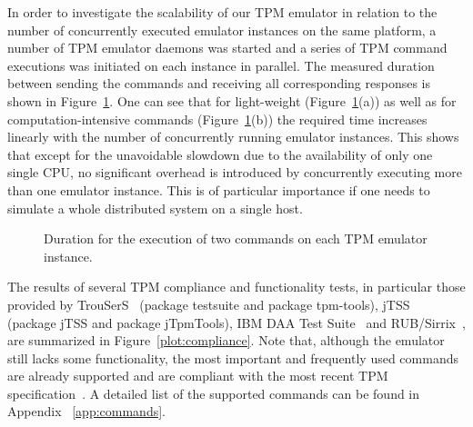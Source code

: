 \documentclass[runningheads]{llncs}
\begin{document}
In order to investigate the scalability of our TPM emulator in relation to
the number of concurrently executed emulator instances on the same platform,
a number of TPM emulator daemons was started and a series of TPM command
executions was initiated on each instance in parallel. The measured duration
between sending the commands and receiving all corresponding responses is shown
in Figure~\ref{plot:execution_time}. One can see that for light-weight
(Figure~\ref{plot:execution_time}(a)) as well as for computation-intensive
commands (Figure~\ref{plot:execution_time}(b)) the required time increases
linearly with the number of concurrently running emulator instances. This
shows that except for the unavoidable slowdown due to the availability of
only one single CPU, no significant overhead is introduced by concurrently
executing more than one emulator instance. This is of particular importance
if one needs to simulate a whole distributed system on a single host.

\begin{figure}
  \centering
  \quad%
  \vspace*{-2mm}
  \caption{Duration for the execution of two commands on each TPM emulator
           instance.}
  \label{plot:execution_time}\vspace*{-5mm}
\end{figure}

The results of several TPM compliance and functionality tests, in particular
those provided by TrouSerS~\cite{trousers} (package testsuite and package
tpm-tools), jTSS~\cite{jTSS} (package jTSS and package jTpmTools), IBM DAA Test
Suite~\cite{ibmdaatest} and RUB/Sirrix~\cite{Sadeghi}, are summarized in
Figure~\ref{plot:compliance}. Note that, although the emulator still lacks some
functionality, the most important and frequently used commands are already
supported and are compliant with the most recent TPM specification~\cite{TPM}.
A detailed list of the supported commands can be found in Appendix~%
\ref{app:commands}.
\end{document}
